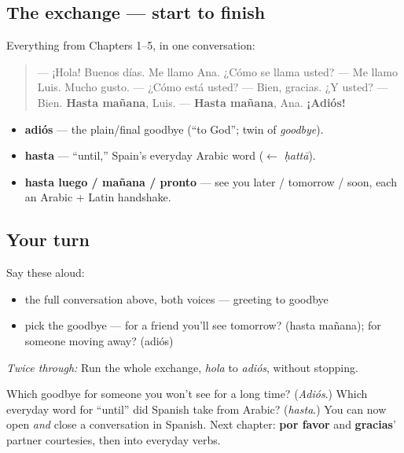 \subsection*{The exchange — start to finish}
Everything from Chapters 1–5, in one conversation:

\begin{quote}
— ¡Hola! Buenos días. Me llamo Ana. ¿Cómo se llama usted? — Me llamo Luis. Mucho gusto. — ¿Cómo está usted? — Bien, gracias. ¿Y usted? — Bien. \textbf{Hasta mañana}, Luis. — \textbf{Hasta mañana}, Ana. \textbf{¡Adiós!}
\end{quote}

\begin{grammarlens}[title={What you've built this chapter}]
\begin{itemize}
\raggedright
  \item \textbf{adiós} — the plain/final goodbye (\textquotedblleft{}to God\textquotedblright{}; twin of \emph{goodbye}).
  \item \textbf{hasta} — \textquotedblleft{}until,\textquotedblright{} Spain's everyday Arabic word ($\leftarrow$ \emph{ḥattā}).
  \item \textbf{hasta luego / mañana / pronto} — see you later / tomorrow / soon, each an Arabic + Latin handshake.
\end{itemize}
\end{grammarlens}

\subsection*{Your turn}
Say these aloud:

\begin{itemize}
\raggedright
  \item the full conversation above, both voices — greeting to goodbye
  \item pick the goodbye — for a friend you'll see tomorrow? (hasta mañana); for someone moving away? (adiós)
\end{itemize}

\emph{Twice through:} Run the whole exchange, \emph{hola} to \emph{adiós}, without stopping.

\begin{tcolorbox}[breakable,colback=teal!4,colframe=teal!35!black,title={Before you move on}]
Which goodbye for someone you won't see for a long time? (\emph{Adiós}.) Which everyday word for \textquotedblleft{}until\textquotedblright{} did Spanish take from Arabic? (\emph{hasta}.) You can now open \emph{and} close a conversation in Spanish. Next chapter: \textbf{por favor} and \textbf{gracias}' partner courtesies, then into everyday verbs.
\end{tcolorbox}
